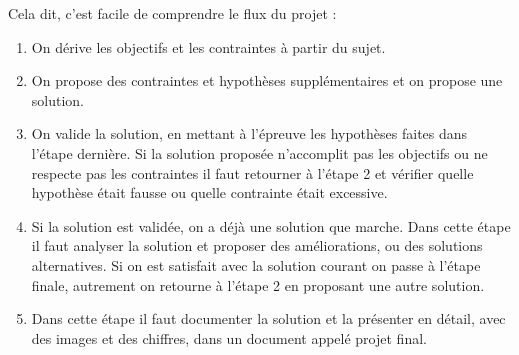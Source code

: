 \vspace{20pt}
Cela dit, c’est facile de comprendre le flux du projet :
\begin{enumerate}
	\item On dérive les objectifs et les contraintes à partir du sujet.
\item	On propose des contraintes et hypothèses supplémentaires et on propose une solution. 
\item	On valide la solution, en mettant à l’épreuve les hypothèses faites dans l’étape dernière. Si la solution proposée n’accomplit pas les objectifs ou ne respecte pas les contraintes il faut retourner à l’étape 2 et vérifier quelle hypothèse était fausse ou quelle contrainte était excessive.
\item	Si la solution est validée, on a déjà une solution que marche. Dans cette étape il faut analyser la solution et proposer des améliorations, ou des solutions alternatives. Si on est satisfait avec la solution courant on passe à l’étape finale, autrement on retourne à l’étape 2 en proposant une autre solution.
\item	Dans cette étape il faut documenter la solution et la présenter en détail, avec des images et des chiffres, dans un document appelé projet final.

\end{enumerate}
